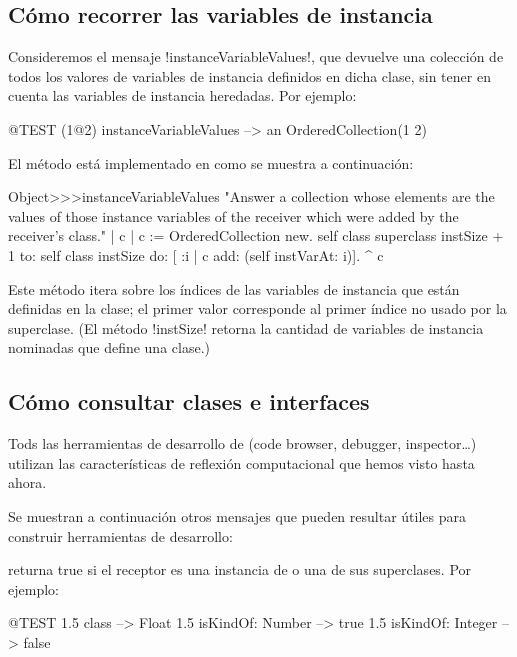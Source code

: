 \documentclass[a4paper,10pt,twoside]{book}
\begin{document}
\subsection{Cómo recorrer las variables de instancia}

Consideremos el mensaje \ct!instanceVariableValues!, que devuelve una
colección de todos los valores de variables de instancia definidos en
dicha clase, sin tener en cuenta las variables de instancia
heredadas.  Por ejemplo:
\begin{code}{@TEST}
(1@2) instanceVariableValues --> an OrderedCollection(1 2)
\end{code}

El método está implementado en  como se muestra a
continuación:
\begin{code}{}
Object>>>instanceVariableValues
        "Answer a collection whose elements are the values of those instance variables of the receiver which were added by the receiver's class."
        | c |
        c := OrderedCollection new.
        self class superclass instSize + 1
                to: self class instSize
                do: [ :i | c add: (self instVarAt: i)].
        ^ c
\end{code}

Este método itera sobre los índices de las variables de instancia que
están definidas en la clase; el primer valor corresponde al primer
índice no usado por la superclase.  (El método \ct!instSize! retorna
la cantidad de variables de instancia nominadas que define una clase.)

\subsection{Cómo consultar clases e interfaces}

Tods las herramientas de desarrollo de \pharo (code browser,
debugger, inspector\ldots) utilizan las características de reflexión
computacional que hemos visto hasta ahora.

Se muestran a continuación otros mensajes que pueden resultar útiles
para construir herramientas de desarrollo:

 returna true si el receptor es una
instancia de  o una de sus superclases.  Por
ejemplo:
\begin{code}{@TEST}
1.5 class                     --> Float
1.5 isKindOf: Number --> true
1.5 isKindOf: Integer   --> false
\end{code}
\end{document}
